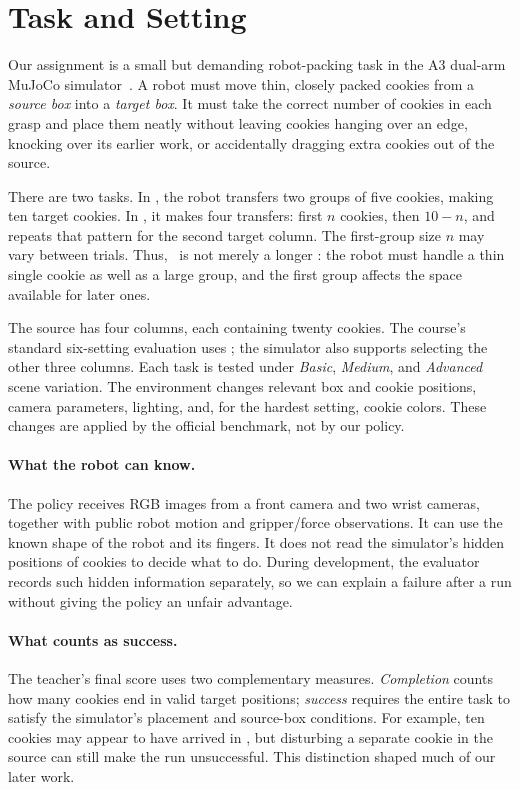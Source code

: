 \section{Task and Setting}
\label{sec:task}
Our assignment is a small but demanding robot-packing task in the A3 dual-arm MuJoCo simulator~\cite{a3}. A robot must move thin, closely packed cookies from a \emph{source box} into a \emph{target box}. It must take the correct number of cookies in each grasp and place them neatly without leaving cookies hanging over an edge, knocking over its earlier work, or accidentally dragging extra cookies out of the source.

There are two tasks. In \pFive, the robot transfers two groups of five cookies, making ten target cookies. In \pTen, it makes four transfers: first $n$ cookies, then $10-n$, and repeats that pattern for the second target column. The first-group size $n$ may vary between trials. Thus, \pTen\ is not merely a longer \pFive: the robot must handle a thin single cookie as well as a large group, and the first group affects the space available for later ones.

The source has four columns, each containing twenty cookies. The course's standard six-setting evaluation uses \srcone; the simulator also supports selecting the other three columns. Each task is tested under \emph{Basic}, \emph{Medium}, and \emph{Advanced} scene variation. The environment changes relevant box and cookie positions, camera parameters, lighting, and, for the hardest setting, cookie colors. These changes are applied by the official benchmark, not by our policy.

\paragraph{What the robot can know.}
The policy receives RGB images from a front camera and two wrist cameras, together with public robot motion and gripper/force observations. It can use the known shape of the robot and its fingers. It does not read the simulator's hidden positions of cookies to decide what to do. During development, the evaluator records such hidden information separately, so we can explain a failure after a run without giving the policy an unfair advantage.

\paragraph{What counts as success.}
The teacher's final score uses two complementary measures. \emph{Completion} counts how many cookies end in valid target positions; \emph{success} requires the entire task to satisfy the simulator's placement and source-box conditions. For example, ten cookies may appear to have arrived in \pFive, but disturbing a separate cookie in the source can still make the run unsuccessful. This distinction shaped much of our later work.

